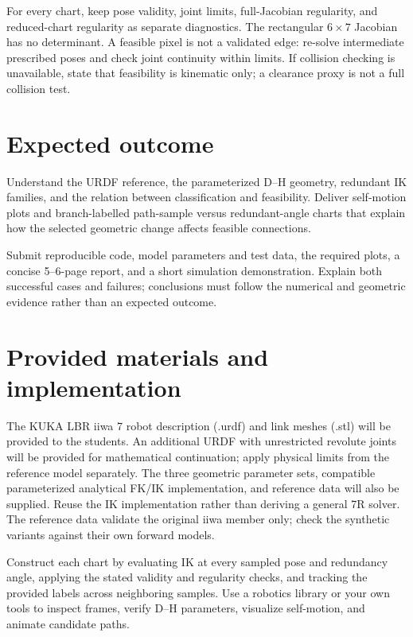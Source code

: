 \documentclass[11pt,a4paper]{article}
\begin{document}
For every chart, keep pose validity, joint limits,
full-Jacobian regularity, and reduced-chart regularity as separate diagnostics.
The rectangular $6\times7$ Jacobian has no determinant. A feasible pixel is
not a validated edge: re-solve intermediate prescribed poses and check joint
continuity within limits. If collision checking is unavailable, state that
feasibility is kinematic only; a clearance proxy is not a full collision test.

\section*{Expected outcome}
Understand the URDF reference, the parameterized D--H geometry, redundant
IK families, and the relation between classification and feasibility. Deliver
self-motion plots and branch-labelled path-sample versus redundant-angle charts
that explain how the selected geometric change affects feasible connections.

Submit reproducible code, model parameters and test data, the required plots,
a concise 5--6-page report, and a short simulation demonstration. Explain
both successful cases and failures; conclusions must follow the numerical
and geometric evidence rather than an expected outcome.

\section*{Provided materials and implementation}
The KUKA LBR iiwa 7 robot description (.urdf) and link meshes (.stl) will be
provided to the students. An additional URDF with unrestricted revolute joints
will be provided for mathematical continuation; apply physical limits from
the reference model separately. The three geometric parameter sets, compatible
parameterized analytical FK/IK implementation, and reference data will also
be supplied. Reuse the IK implementation rather than deriving a general 7R
solver. The reference data validate the original iiwa member only; check
the synthetic variants against their own forward models.

Construct each chart by evaluating IK at every sampled pose and redundancy
angle, applying the stated validity and regularity checks, and tracking the
provided labels across neighboring samples. Use a robotics library or your own
tools to inspect frames, verify D--H parameters, visualize self-motion, and
animate candidate paths.
\end{document}
